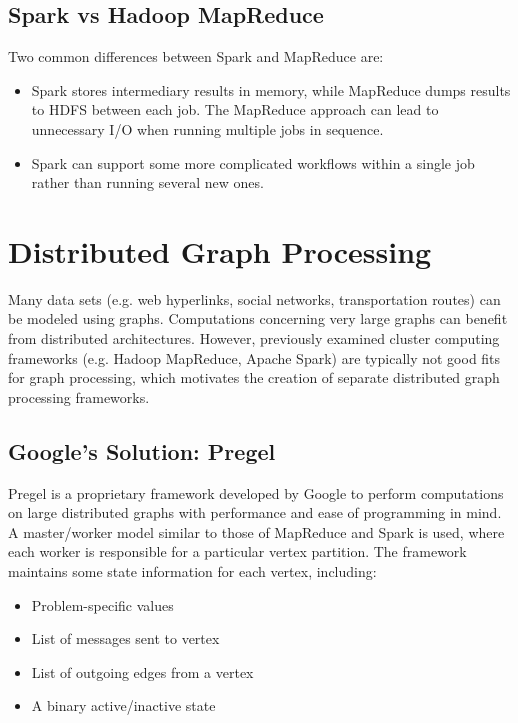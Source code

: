\documentclass[12pt,titlepage]{article}
\begin{document}
    \subsection{Spark vs Hadoop MapReduce}
      Two common differences between Spark and MapReduce are:
      \begin{itemize}
        \item Spark stores intermediary results in memory, while MapReduce dumps results to HDFS between each job. The MapReduce approach can lead to unnecessary I/O
          when running multiple jobs in sequence.
        \item Spark can support some more complicated workflows within a single job rather than running several new ones.
      \end{itemize}

  \section{Distributed Graph Processing}
    Many data sets (e.g. web hyperlinks, social networks, transportation routes) can be modeled using graphs. Computations concerning very large graphs can benefit
    from distributed architectures. However, previously examined cluster computing frameworks (e.g. Hadoop MapReduce, Apache Spark) are typically not good fits for
    graph processing, which motivates the creation of separate distributed graph processing frameworks.

    \subsection{Google's Solution: Pregel}
      Pregel is a proprietary framework developed by Google to perform computations on large distributed graphs with performance and ease of programming in mind.
      A master/worker model similar to those of MapReduce and Spark is used, where each worker is responsible for a particular vertex partition. The framework
      maintains some state information for each vertex, including:
      \begin{itemize}
        \item Problem-specific values
        \item List of messages sent to vertex
        \item List of outgoing edges from a vertex
        \item A binary active/inactive state
      \end{itemize}
\end{document}
